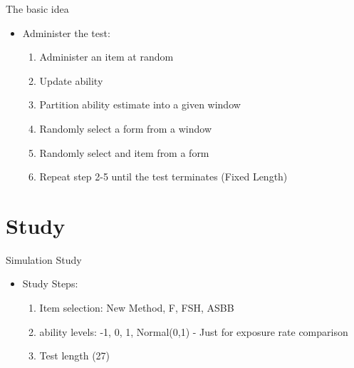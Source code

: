 \documentclass{beamer}
\begin{document}
\begin{frame}{The basic idea}
  \begin{itemize}
  \item Administer the test:
    \begin{enumerate}[1.)]
    \item Administer an item at random
    \item Update ability
    \item Partition ability estimate into a given window
    \item Randomly select a form from a window
    \item Randomly select and item from a form
    \item Repeat step 2-5 until the test terminates (Fixed Length)
    \end{enumerate}
\end{itemize}
\end{frame}

\section{Study}
\begin{frame}{Simulation Study}
\begin{itemize}
\item Study Steps:
  \begin{enumerate}[1)]
  \item Item selection: New Method, F, FSH, ASBB
  \item ability levels: -1, 0, 1, Normal(0,1) - Just for exposure rate comparison
  \item Test length (27)
  \end{enumerate}
\end{itemize}
\end{frame}
\end{document}
